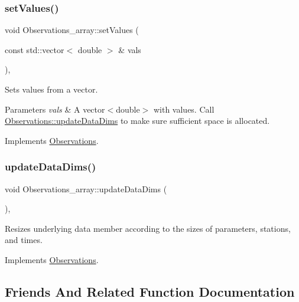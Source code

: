 \subsubsection{\texorpdfstring{set\+Values()}{setValues()}}
{\footnotesize\ttfamily void Observations\+\_\+array\+::set\+Values (\begin{DoxyParamCaption}\item[{const std\+::vector$<$ double $>$ \&}]{vals }\end{DoxyParamCaption})\hspace{0.3cm}{\ttfamily [override]}, {\ttfamily [virtual]}}

Sets values from a vector.


\begin{DoxyParams}{Parameters}
{\em vals} & A vector$<$double$>$ with values. Call \mbox{\hyperlink{class_observations_aab0540879c2d3fdf5f91d30ea2f902fd}{Observations\+::update\+Data\+Dims}} to make sure sufficient space is allocated. \\
\hline
\end{DoxyParams}


Implements \mbox{\hyperlink{class_observations_a3aaf49cad714ff61c105d26b4b083ac3}{Observations}}.

\mbox{\label{class_observations__array_aa9364c4356d1f8a2b430c93a1fcd021f}} 
\subsubsection{\texorpdfstring{update\+Data\+Dims()}{updateDataDims()}}
{\footnotesize\ttfamily void Observations\+\_\+array\+::update\+Data\+Dims (\begin{DoxyParamCaption}{ }\end{DoxyParamCaption})\hspace{0.3cm}{\ttfamily [override]}, {\ttfamily [virtual]}}

Resizes underlying data member according to the sizes of parameters, stations, and times. 

Implements \mbox{\hyperlink{class_observations_aab0540879c2d3fdf5f91d30ea2f902fd}{Observations}}.



\subsection{Friends And Related Function Documentation}
\mbox{\label{class_observations__array_affb01c6a2af2ae2b833f7edec435234d}} 
